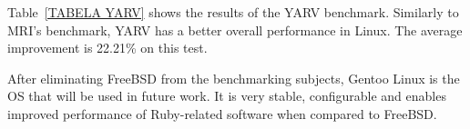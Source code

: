 Table~\ref{TABELA YARV} shows the results of the YARV benchmark. Similarly to MRI's benchmark, YARV has a better overall performance in Linux. The average improvement is 22.21\% on this test.

After eliminating FreeBSD from the benchmarking subjects, Gentoo Linux is the OS that will be used in future work. It is very stable, configurable and enables improved performance of Ruby-related software when compared to FreeBSD.

\begin{comment}
Use the generic benchmarks mentioned above

Web server benchmark (Nginx/Apache on each disto)

Ruby benchmarks on each OS

Show results and analysis
\end{comment}


